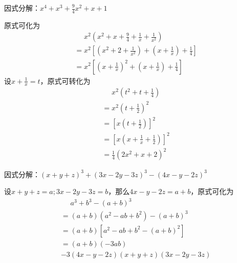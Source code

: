 \documentclass[windows,csize4,answers]{BHCexam}
\begin{document}
\begin{groups}
\begin{questions}[]
        \question[5] 因式分解：$x^4+x^3+\frac{9}{4} x^2+x+1$
        \begin{solution}{0.5cm}
            \methodonly 原式可化为
            \[
                \begin{aligned}
                     & \phantom{=}x^2\left(x^2+x+\frac{9}{4}+\frac{1}{x}+\frac{1}{x^2}\right) \\
                     & = x^2\left[\left(x^2+2+\frac{1}{x^2}\right)+
                        \left(x+\frac{1}{x}\right)+\frac{1}{4}\right]                         \\
                     & = x^2\left[\left(x+\frac{1}{x}\right)^2+
                        \left(x+\frac{1}{x}\right)+\frac{1}{4}\right]
                \end{aligned}
            \]
            设$x+\frac{1}{x}=t$，原式可转化为
            \[
                \begin{aligned}
                     & \phantom{=}x^2\left(t^2+t+\frac{1}{4}\right)              \\
                     & = x^2 \left(t+\frac{1}{2}\right)^2                        \\
                     & = \left[x \left(t+\frac{1}{2}\right)\right]^2             \\
                     & = \left[x \left(x+\frac{1}{x}+\frac{1}{2}\right)\right]^2 \\
                     & = \frac{1}{4}(2x^2+x+2)^2
                \end{aligned}
            \]
        \end{solution}

        \question[5] 因式分解：$(x+y+z)^3+(3x-2y-3z)^3-(4x-y-2z)^3$
        \begin{solution}{0.5cm}
            \methodonly 设$x+y+z=a;3x-2y-3z=b$，那么$4x-y-2z=a+b$，原式可化为
            \[
                \begin{aligned}
                     & \phantom{=}a^3+b^3-(a+b)^3 \\
                     & = (a+b)(a^2-ab+b^2)-(a+b)^3 \\ 
                     & = (a+b)[a^2-ab+b^2-(a+b)^2] \\ 
                     & = (a+b)(-3ab) \\ 
                     &-3(4x-y-2z)(x+y+z)(3x-2y-3z)
                \end{aligned}
            \]
        \end{solution}
        \vspace{3.5cm}

    \end{questions}
\end{groups}

\label{lastpage}
\end{document}
